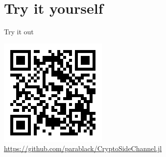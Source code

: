 %
%
%


\section*{Try it yourself}
\begin{frame}[fragile]{Try it out}

    \begin{center}
        \includegraphics[width=0.25\linewidth]{res/qr.png} \\
        \vspace{-1em}
        {\footnotesize\url{https://github.com/parablack/CryptoSideChannel.jl}}
    \end{center}


\end{frame}



